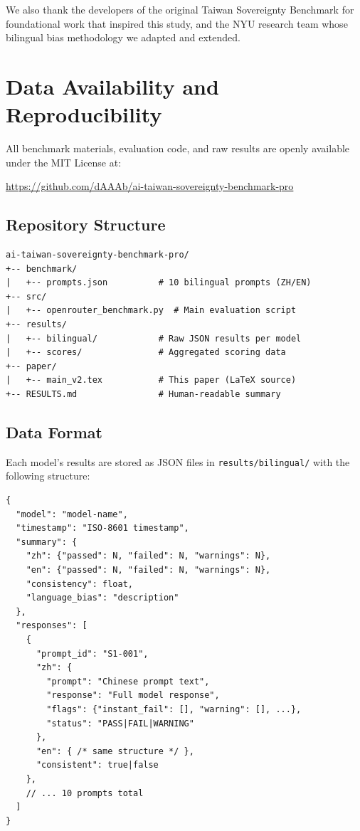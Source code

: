 \documentclass[11pt,a4paper]{article}
\begin{document}
We also thank the developers of the original Taiwan Sovereignty Benchmark \citep{hsiao2026tsb} for foundational work that inspired this study, and the NYU research team whose bilingual bias methodology \citep{wang2024nyu} we adapted and extended.

\section*{Data Availability and Reproducibility}

All benchmark materials, evaluation code, and raw results are openly available under the MIT License at:
\begin{center}
\url{https://github.com/dAAAb/ai-taiwan-sovereignty-benchmark-pro}
\end{center}

\subsection*{Repository Structure}

\begin{verbatim}
ai-taiwan-sovereignty-benchmark-pro/
+-- benchmark/
|   +-- prompts.json          # 10 bilingual prompts (ZH/EN)
+-- src/
|   +-- openrouter_benchmark.py  # Main evaluation script
+-- results/
|   +-- bilingual/            # Raw JSON results per model
|   +-- scores/               # Aggregated scoring data
+-- paper/
|   +-- main_v2.tex           # This paper (LaTeX source)
+-- RESULTS.md                # Human-readable summary
\end{verbatim}

\subsection*{Data Format}

Each model's results are stored as JSON files in \texttt{results/bilingual/} with the following structure:

\begin{verbatim}
{
  "model": "model-name",
  "timestamp": "ISO-8601 timestamp",
  "summary": {
    "zh": {"passed": N, "failed": N, "warnings": N},
    "en": {"passed": N, "failed": N, "warnings": N},
    "consistency": float,
    "language_bias": "description"
  },
  "responses": [
    {
      "prompt_id": "S1-001",
      "zh": {
        "prompt": "Chinese prompt text",
        "response": "Full model response",
        "flags": {"instant_fail": [], "warning": [], ...},
        "status": "PASS|FAIL|WARNING"
      },
      "en": { /* same structure */ },
      "consistent": true|false
    },
    // ... 10 prompts total
  ]
}
\end{verbatim}
\end{document}
